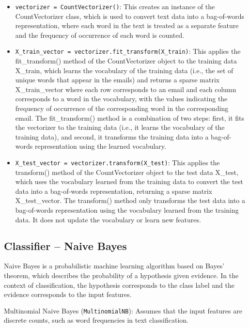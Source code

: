 \documentclass[11pt]{article}
\providecommand{\tightlist}{%
      \setlength{\itemsep}{0pt}\setlength{\parskip}{0pt}}
\begin{document}
\begin{itemize}
\tightlist
\item
  \texttt{vectorizer\ =\ CountVectorizer()}: This creates an instance of
  the CountVectorizer class, which is used to convert text data into a
  bag-of-words representation, where each word in the text is treated as
  a separate feature and the frequency of occurrence of each word is
  counted.
\item
  \texttt{X\_train\_vector\ =\ vectorizer.fit\_transform(X\_train)}:
  This applies the fit\_transform() method of the CountVectorizer object
  to the training data X\_train, which learns the vocabulary of the
  training data (i.e., the set of unique words that appear in the
  emails) and returns a sparse matrix X\_train\_vector where each row
  corresponds to an email and each column corresponds to a word in the
  vocabulary, with the values indicating the frequency of occurrence of
  the corresponding word in the corresponding email. The
  fit\_transform() method is a combination of two steps: first, it fits
  the vectorizer to the training data (i.e., it learns the vocabulary of
  the training data), and second, it transforms the training data into a
  bag-of-words representation using the learned vocabulary.
\item
  \texttt{X\_test\_vector\ =\ vectorizer.transform(X\_test)}: This
  applies the transform() method of the CountVectorizer object to the
  test data X\_test, which uses the vocabulary learned from the training
  data to convert the test data into a bag-of-words representation,
  returning a sparse matrix X\_test\_vector. The transform() method only
  transforms the test data into a bag-of-words representation using the
  vocabulary learned from the training data. It does not update the
  vocabulary or learn new features.
\end{itemize}

    \hypertarget{classifier-naive-bayes}{%
\subsection{Classifier -- Naive Bayes}\label{classifier-naive-bayes}}

    Naive Bayes is a probabilistic machine learning algorithm based on
Bayes' theorem, which describes the probability of a hypothesis given
evidence. In the context of classification, the hypothesis corresponds
to the class label and the evidence corresponds to the input features.

Multinomial Naive Bayes (\texttt{MultinomialNB}): Assumes that the input
features are discrete counts, such as word frequencies in text
classification.
\end{document}
